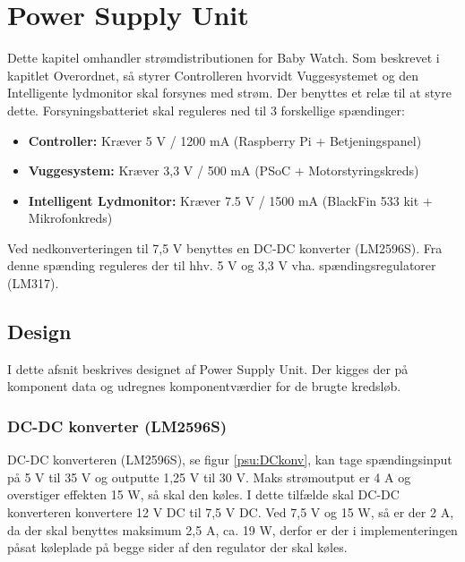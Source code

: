 \chapter{Power Supply Unit}

Dette kapitel omhandler strømdistributionen for Baby Watch. Som beskrevet i kapitlet Overordnet, så styrer Controlleren hvorvidt Vuggesystemet og den Intelligente lydmonitor skal forsynes med strøm. Der benyttes et relæ til at styre dette. Forsyningsbatteriet skal reguleres ned til 3 forskellige spændinger:

\begin{itemize}
\item \textbf{Controller:} Kræver 5 V / 1200 mA (Raspberry Pi + Betjeningspanel)

\item \textbf{Vuggesystem:} Kræver 3,3 V / 500 mA (PSoC + Motorstyringskreds)

\item \textbf{Intelligent Lydmonitor:} Kræver 7.5 V / 1500 mA (BlackFin 533 kit + Mikrofonkreds)
\end{itemize}

Ved nedkonverteringen til 7,5 V benyttes en DC-DC konverter (LM2596S). Fra denne spænding reguleres der til hhv. 5 V og 3,3 V vha. spændingsregulatorer (LM317). 

\section{Design}

I dette afsnit beskrives designet af Power Supply Unit. Der kigges der på komponent data og udregnes komponentværdier for de brugte kredsløb.

\subsection{DC-DC konverter (LM2596S)}

DC-DC konverteren (LM2596S), se figur \ref{psu:DCkonv}, kan tage spændingsinput på 5 V til 35 V og outputte 1,25 V til 30 V. Maks strømoutput er 4 A og overstiger effekten 15 W, så skal den køles. I dette tilfælde skal DC-DC konverteren konvertere 12 V DC til 7,5 V DC. Ved 7,5 V og 15 W, så er der 2 A, da der skal benyttes maksimum 2,5 A, ca. 19 W, derfor er der i implementeringen påsat køleplade på begge sider af den regulator der skal køles. 


